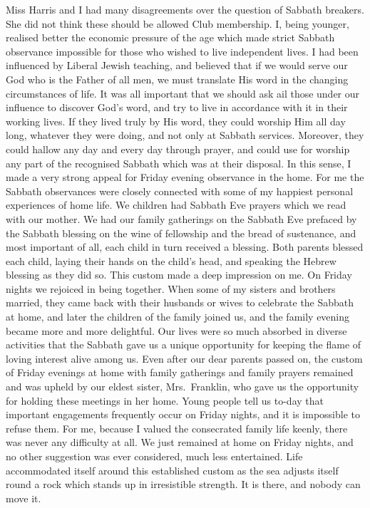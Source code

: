 Miss Harris and I had many disagreements over the
question of Sabbath breakers. She did not think these
should be allowed Club membership. I, being younger,
realised better the economic pressure of the age which
made strict Sabbath observance impossible for those who
wished to live independent lives. I had been influenced
by Liberal Jewish teaching, and believed that if we would
serve our God who is the Father of all men, we must
translate His word in the changing circumstances of life.
It was all important that we should ask ail those under
our influence to discover God’s word, and try to live in
accordance with it in their working lives. If they lived
truly by His word, they could worship Him all day long,
whatever they were doing, and not only at Sabbath services.
Moreover, they could hallow any day and every
day through prayer, and could use for worship any part
of the recognised Sabbath which was at their disposal.
In this sense, I made a very strong appeal for Friday
evening observance in the home. For me the Sabbath
observances were closely connected with some of my
happiest personal experiences of home life. We children
had Sabbath Eve prayers which we read with our
mother. We had our family gatherings on the Sabbath
Eve prefaced by the Sabbath blessing on the wine of
fellowship and the bread of sustenance, and most important
of all, each child in turn received a blessing. Both
parents blessed each child, laying their hands on the
child’s head, and speaking the Hebrew blessing as they did
so. This custom made a deep impression on me. On
Friday nights we rejoiced in being together. When some
of my sisters and brothers married, they came back with
their husbands or wives to celebrate the Sabbath at home,
and later the children of the family joined us, and the
family evening became more and more delightful. Our
lives were so much absorbed in diverse activities that the
Sabbath gave us a unique opportunity for keeping the
flame of loving interest alive among us. Even after our
dear parents passed on, the custom of Friday evenings
at home with family gatherings and family prayers
remained and was upheld by our eldest sister,
Mrs.\ Franklin, who gave us the opportunity for holding these
meetings in her home. Young people tell us to-day that
important engagements frequently occur on Friday
nights, and it is impossible to refuse them. For me,
because I valued the consecrated family life keenly, there
was never any difficulty at all. We just remained at home
on Friday nights, and no other suggestion was ever considered,
much less entertained. Life accommodated itself
around this established custom as the sea adjusts itself
round a rock which stands up in irresistible strength. It
is there, and nobody can move it.

